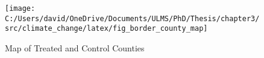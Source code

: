 \begin{figure}[H]
    \centering
    \texttt{[image: C:/Users/david/OneDrive/Documents/ULMS/PhD/Thesis/chapter3/src/climate\_change/latex/fig\_border\_county\_map]}
    \caption{Map of Treated and Control Counties}
    \label{fig:border-county-map}
\end{figure}